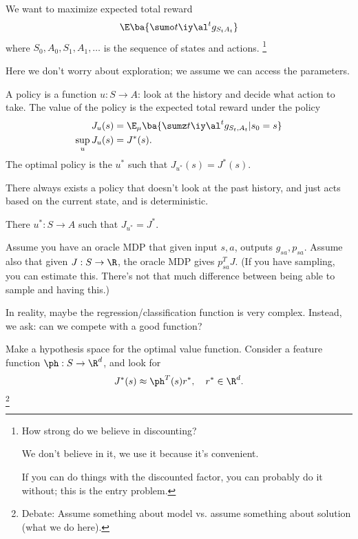 We want to maximize expected total reward
$$
\E\ba{\sumo t\iy \al^t g_{S_tA_t}}
$$
where $S_0,A_0,S_1,A_1,\ldots$ is the sequence of states and actions.
\footnote{How strong do we believe in discounting?

We don't believe in it, we use it because it's convenient.

If you can do things with the discounted factor, you can probably do it without; this is the entry problem.}

Here we don't worry about exploration; we assume we can access the parameters.


A policy is a function $u:S\to A$: look at the history and decide what action to take. The value of the policy is the expected total reward under the policy
\begin{align}
J_u(s) &= \E_\mu\ba{\sumz t\iy \al^t g_{S_t,A_t}|s_0=s}\\
\sup_u J_u(s) &= J^*(s).
\end{align}
The optimal policy is the $u^*$ such that $J_{u^*}(s) = J^*(s)$.

There always exists a policy that doesn't look at the past history, and just acts based on the current state, and is deterministic.
\begin{thm}
There $u^*:S\to A$ such that $J_{u^*}=J^*$.
\end{thm}

Assume you have an oracle MDP that given input $s,a$, outputs $g_{sa},p_{sa}$. Assume also that given $J:S\to \R$, the oracle MDP gives $p_{sa}^TJ$. %
(If you have sampling, you can estimate this. There's not that much difference between being able to sample and having this.)



In reality, maybe the  regression/classification function is very complex. Instead, we ask: can we compete with a good function?

Make a hypothesis space for the optimal value function. Consider a feature function $\ph:S\to \R^d$, and look for
$$
J^*(s) \approx \ph^T(s)r^*,\quad r^*\in \R^d.
$$
\footnote{Debate: 
Assume something about model vs. assume something about solution (what we do here).}

